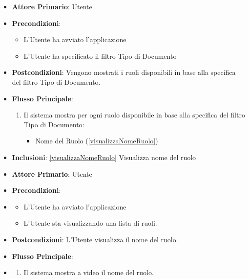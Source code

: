\begin{itemize}
      \item \textbf{Attore Primario}: Utente
      \item \textbf{Precondizioni}: 
      \begin{itemize}
            \item L'Utente ha avviato l'applicazione
            \item L'Utente ha specificato il filtro Tipo di Documento
      \end{itemize}
      \item \textbf{Postcondizioni}: Vengono mostrati i ruoli disponibili in base alla specifica del filtro Tipo di Documento.
      \item \textbf{Flusso Principale}:
            \begin{enumerate}
                  \item Il sistema mostra per ogni ruolo disponibile in base alla specifica del filtro Tipo di Documento:
                        \begin{itemize}
                              \item Nome del Ruolo (\ref{visualizzaNomeRuolo})
                        \end{itemize}
            \end{enumerate}
      \item \textbf{Inclusioni}: \ref{visualizzaNomeRuolo} Visualizza nome del ruolo
\end{itemize}

\begin{itemize}
      \item \textbf{Attore Primario}: Utente
      \item \textbf{Precondizioni}:
      \item \begin{itemize}
            \item L'Utente ha avviato l'applicazione
            \item L'Utente sta visualizzando una lista di ruoli.
      \end{itemize}
      \item \textbf{Postcondizioni}: L'Utente visualizza il nome del ruolo.
      \item \textbf{Flusso Principale}:
      \item \begin{enumerate}
            \item Il sistema mostra a video il nome del ruolo.
      \end{enumerate}
\end{itemize}

